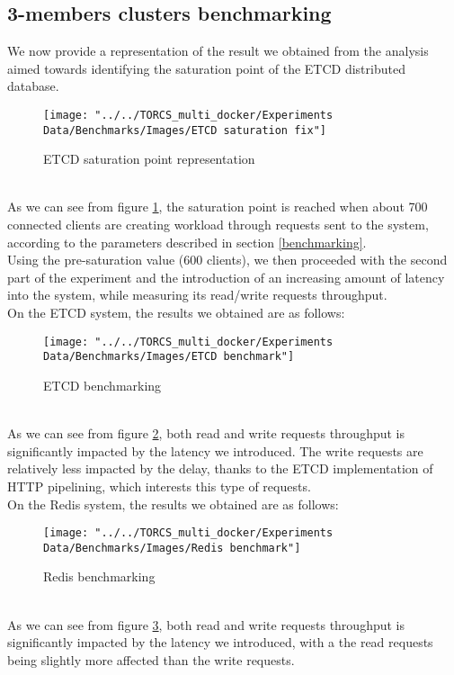 \subsection{3-members clusters benchmarking}
We now provide a representation of the result we obtained from the analysis aimed towards identifying the saturation point of the ETCD distributed database.
\begin{figure}[h!]
	\centering
	\texttt{[image: "../../TORCS\_multi\_docker/Experiments Data/Benchmarks/Images/ETCD saturation fix"]}
	\caption[ETCD saturation point representation]{ETCD saturation point representation}
	\label{fig:etcd-saturation-fix}
\end{figure}
\\ As we can see from figure \ref{fig:etcd-saturation-fix}, the saturation point is reached when about 700 connected clients are creating workload through requests sent to the system, according to the parameters described in section \ref{benchmarking}. \\
Using the pre-saturation value (600 clients), we then proceeded with the second part of the experiment and the introduction of an increasing amount of latency into the system, while measuring its read/write requests throughput. \\
On the ETCD system, the results we obtained are as follows:
\begin{figure}[h!]
	\centering
	\texttt{[image: "../../TORCS\_multi\_docker/Experiments Data/Benchmarks/Images/ETCD benchmark"]}
	\caption[ETCD benchmarking]{ETCD benchmarking}
	\label{fig:etcd-benchmark}
\end{figure}
\\ As we can see from figure \ref{fig:etcd-benchmark}, both read and write requests throughput is significantly impacted by the latency we introduced. The write requests are relatively less impacted by the delay, thanks to the ETCD implementation of HTTP pipelining, which interests this type of requests. \\
On the Redis system, the results we obtained are as follows:
\begin{figure}[h!]
	\centering
	\texttt{[image: "../../TORCS\_multi\_docker/Experiments Data/Benchmarks/Images/Redis benchmark"]}
	\caption[Redis benchmarking]{Redis benchmarking}
	\label{fig:redis-benchmark}
\end{figure}
\\ As we can see from figure \ref{fig:redis-benchmark}, both read and write requests throughput is significantly impacted by the latency we introduced, with a the read requests being slightly more affected than the write requests.

